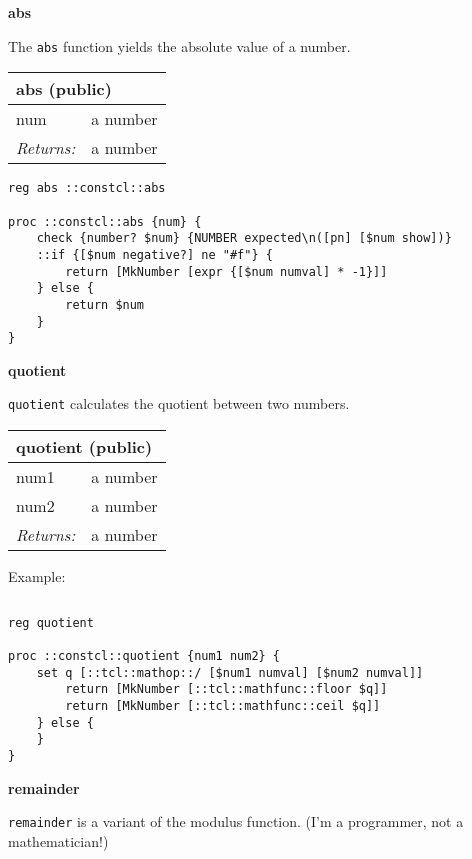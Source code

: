 \documentclass{report}
\begin{document}
\textbf{abs}


The \texttt{abs} function yields the absolute value of a number.

\begin{tabular}{ |l l| }
\hline
\multicolumn{2}{|l|}{abs (public)} \\
\hline
num & a number \\
\textit{Returns:} & a number \\
\hline
\end{tabular}

\noindent\makebox[\linewidth]{\rule{\linewidth}{0.4pt}}
\begin{lstlisting}
reg abs ::constcl::abs
 
proc ::constcl::abs {num} {
    check {number? $num} {NUMBER expected\n([pn] [$num show])}
    ::if {[$num negative?] ne "#f"} {
        return [MkNumber [expr {[$num numval] * -1}]]
    } else {
        return $num
    }
}
\end{lstlisting}
\noindent\makebox[\linewidth]{\rule{\linewidth}{0.4pt}}

\textbf{quotient}


\texttt{quotient} calculates the quotient between two numbers.

\begin{tabular}{ |l l| }
\hline
\multicolumn{2}{|l|}{quotient (public)} \\
\hline
num1 & a number \\
num2 & a number \\
\textit{Returns:} & a number \\
\hline
\end{tabular}


Example:

\noindent\makebox[\linewidth]{\rule{\linewidth}{0.4pt}}
\begin{lstlisting}
\end{lstlisting}
\noindent\makebox[\linewidth]{\rule{\linewidth}{0.4pt}}
\noindent\makebox[\linewidth]{\rule{\linewidth}{0.4pt}}
\begin{lstlisting}
reg quotient
 
proc ::constcl::quotient {num1 num2} {
    set q [::tcl::mathop::/ [$num1 numval] [$num2 numval]]
        return [MkNumber [::tcl::mathfunc::floor $q]]
        return [MkNumber [::tcl::mathfunc::ceil $q]]
    } else {
    }
}
\end{lstlisting}
\noindent\makebox[\linewidth]{\rule{\linewidth}{0.4pt}}

\textbf{remainder}


\texttt{remainder} is a variant of the modulus function. (I'm a programmer, not a mathematician!)
\end{document}
